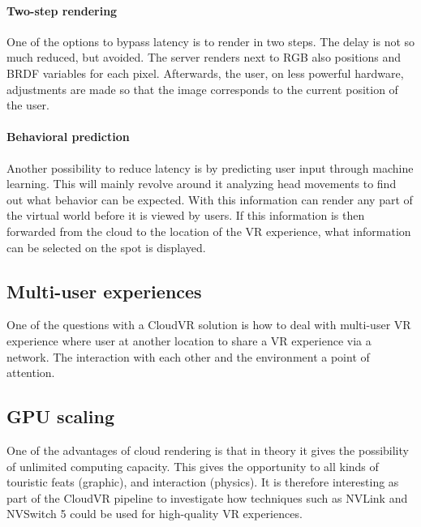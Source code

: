 \paragraph{Two-step rendering}
One of the options to bypass latency is to render in two steps.
The delay is not so much reduced, but avoided. The server renders next to
RGB also positions and BRDF variables for each pixel. Afterwards, the
user, on less powerful hardware, adjustments are made so that the image
corresponds to the current position of the user.
\paragraph{Behavioral prediction}
Another possibility to reduce latency is by predicting
user input through machine learning. This will mainly revolve around it
analyzing head movements to find out what behavior can be expected. With
this information can render any part of the virtual world before it
is viewed by users. If this information is then forwarded from the
cloud to the location of the VR experience, what information can be selected on the spot
is displayed.

\subsection{Multi-user experiences}
One of the questions with a CloudVR solution is how to deal with multi-user VR experience where
user at another location to share a VR experience via a network. The interaction with
each other and the environment a point of attention.

\subsection{GPU scaling}
One of the advantages of cloud rendering is that in theory it gives the possibility of unlimited
computing capacity. This gives the opportunity to all kinds of touristic feats
(graphic), and interaction (physics). It is therefore interesting as part of the CloudVR pipeline
to investigate how techniques such as NVLink and NVSwitch 5 could be used for
high-quality VR experiences.
